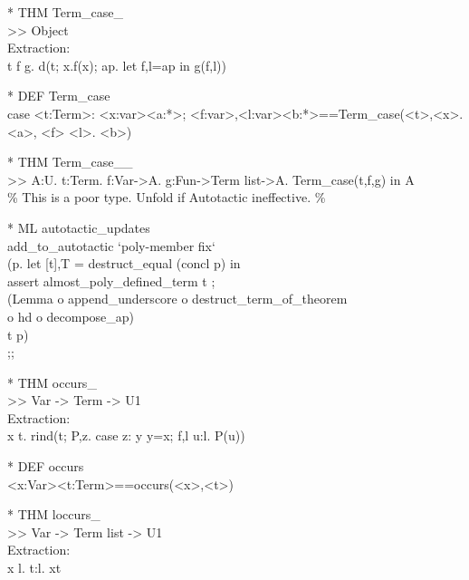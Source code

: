 \begin{prl*}
\>* THM Term\_case\_\\
\>  >> Object\\
\>  Extraction:\\
\>  \mlambda{} t f g. d(t; x.f(x); ap. let f,l=ap in g(f,l))
\end{prl*}

\begin{prl*}
\>* DEF Term\_case\\
\>  case <t:Term>: <x:var>\mrightarrow{}<a:*>; <f:var>,<l:var>\mrightarrow{}<b:*>==Term\_case(<t>,\mlambda{}<x>. <a>,\mlambda{} <f> <l>. <b>)
\end{prl*}

\begin{prl*}
\>* THM Term\_case\_\_\\
\>  >> \mforall{}A:U. \mforall{}t:Term. \mforall{}f:Var->A. \mforall{}g:Fun->Term list->A. Term\_case(t,f,g) in A\\
\>  \% This is a poor type.  Unfold if Autotactic ineffective. \%
\end{prl*}

\begin{prl*}
\>* ML autotactic\_updates\\
\>  add\_to\_autotactic `poly-member fix` \\
\>   (\mbackslash{}p. let [t],T = destruct\_equal (concl p) in\\
\>        assert almost\_poly\_defined\_term t ;\\
\>        (Lemma o append\_underscore o destruct\_term\_of\_theorem \\
\>           o hd o decompose\_ap) \\
\>        t p)\\
\>  ;;
\end{prl*}

\begin{prl*}
\>* THM occurs\_\\
\>  >> Var -> Term -> U1\\
\>  Extraction:\\
\>  \mlambda{} x t. rind(t; P,z. case z: y \mrightarrow{} y=x; f,l \mrightarrow{} \mexists{}u:l. P(u))
\end{prl*}

\begin{prl*}
\>* DEF occurs\\
\>  <x:Var>\mepsilon{}<t:Term>==occurs(<x>,<t>)
\end{prl*}

\begin{prl*}
\>* THM loccurs\_\\
\>  >> Var -> Term list -> U1\\
\>  Extraction:\\
\>  \mlambda{} x l. \mexists{}t:l. x\mepsilon{}t
\end{prl*}

